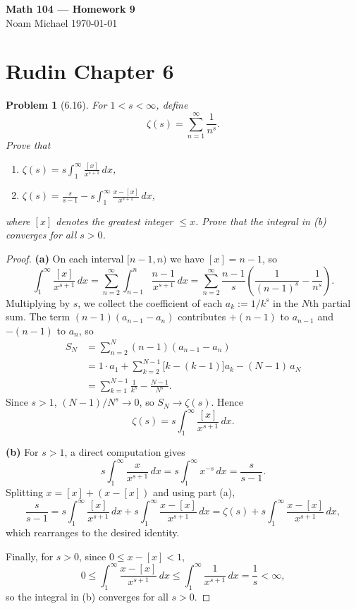\documentclass[12 pt]{article}
\newtheorem{prob}{Problem}
\begin{document}
\begin{center}
    {\Large \textbf{Math 104 --- Homework 9}}\\[0.5em]
    Noam Michael \hfill \today
\end{center}

\section*{Rudin Chapter 6}

\begin{prob}[6.16]
For $1<s<\infty$, define
$$
\zeta(s)=\sum_{n=1}^{\infty} \frac{1}{n^{s}}.
$$
Prove that
\begin{enumerate}
    \item[(a)] $\zeta(s)=s \int_{1}^{\infty} \frac{[x]}{x^{s+1}}\, dx$,
    \item[(b)] $\zeta(s)=\frac{s}{s-1}-s \int_{1}^{\infty} \frac{x-[x]}{x^{s+1}}\, dx$,
\end{enumerate}
where $[x]$ denotes the greatest integer $\leq x$. Prove that the integral in (b) converges for all $s>0$.
\end{prob}
\begin{proof}
\textbf{(a)} On each interval $[n-1, n)$ we have $[x] = n-1$, so
$$
\int_{1}^{\infty} \frac{[x]}{x^{s+1}}\, dx = \sum_{n=2}^{\infty} \int_{n-1}^{n} \frac{n-1}{x^{s+1}}\, dx = \sum_{n=2}^{\infty} \frac{n-1}{s}\left(\frac{1}{(n-1)^{s}} - \frac{1}{n^{s}}\right).
$$
Multiplying by $s$, we collect the coefficient of each $a_k := 1/k^{s}$ in the $N$th partial sum. The term $(n-1)(a_{n-1} - a_n)$ contributes $+(n-1)$ to $a_{n-1}$ and $-(n-1)$ to $a_n$, so
\begin{align*}
S_N &= \sum_{n=2}^{N}(n-1)(a_{n-1} - a_n) \\
    &= 1\cdot a_1 + \sum_{k=2}^{N-1}\bigl[k - (k-1)\bigr] a_k - (N-1)\, a_N \\
    &= \sum_{k=1}^{N-1} \frac{1}{k^{s}} - \frac{N-1}{N^{s}}.
\end{align*}
Since $s > 1$, $(N-1)/N^{s} \to 0$, so $S_N \to \zeta(s)$. Hence
$$
\zeta(s) = s \int_{1}^{\infty} \frac{[x]}{x^{s+1}}\, dx.
$$

\textbf{(b)} For $s > 1$, a direct computation gives
$$
s \int_{1}^{\infty} \frac{x}{x^{s+1}}\, dx = s \int_{1}^{\infty} x^{-s}\, dx = \frac{s}{s-1}.
$$
Splitting $x = [x] + (x - [x])$ and using part (a),
$$
\frac{s}{s-1} = s\int_{1}^{\infty} \frac{[x]}{x^{s+1}}\, dx + s\int_{1}^{\infty} \frac{x-[x]}{x^{s+1}}\, dx = \zeta(s) + s\int_{1}^{\infty} \frac{x-[x]}{x^{s+1}}\, dx,
$$
which rearranges to the desired identity.

Finally, for $s > 0$, since $0 \leq x - [x] < 1$,
$$
0 \leq \int_{1}^{\infty} \frac{x-[x]}{x^{s+1}}\, dx \leq \int_{1}^{\infty} \frac{1}{x^{s+1}}\, dx = \frac{1}{s} < \infty,
$$
so the integral in (b) converges for all $s > 0$.
\end{proof}
\end{document}
